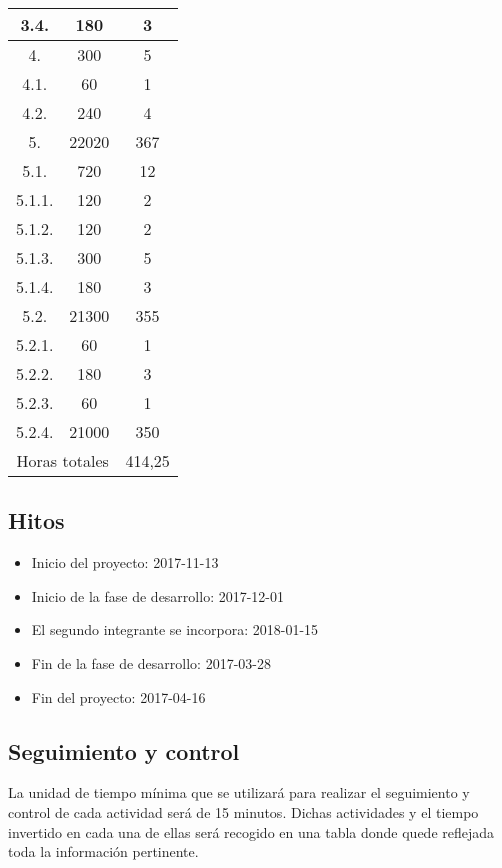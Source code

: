 \begin{longtable}{|c|c|c|}
3.4. & 180 & 3 \\ \hline
4. & 300 & 5 \\ \hline
4.1. & 60 & 1 \\ \hline
4.2. & 240 & 4 \\ \hline
5. & 22020 & 367 \\ \hline
5.1. & 720 & 12 \\ \hline
5.1.1. & 120 & 2 \\ \hline
5.1.2. & 120 & 2 \\ \hline
5.1.3. & 300 & 5 \\ \hline
5.1.4. & 180 & 3 \\ \hline
5.2. & 21300 & 355 \\ \hline
5.2.1. & 60 & 1 \\ \hline
5.2.2. & 180 & 3 \\ \hline
5.2.3. & 60 & 1 \\ \hline
5.2.4. & 21000 & 350 \\ \hline
\multicolumn{2}{|c|}{Horas totales} & 414,25 \\ \hline
\end{longtable}

\subsection{Hitos}
\begin{itemize}
  \item Inicio del proyecto: 2017-11-13
  \item Inicio de la fase de desarrollo: 2017-12-01
  \item El segundo integrante se incorpora: 2018-01-15
  \item Fin de la fase de desarrollo: 2017-03-28
  \item Fin del proyecto: 2017-04-16
\end{itemize}

\subsection{Seguimiento y control}
\label{subsec:syc:timeManagement}
La unidad de tiempo mínima que se utilizará para realizar el seguimiento y
control de cada actividad será de 15 minutos. Dichas actividades y el tiempo
invertido en cada una de ellas será recogido en una tabla donde quede reflejada
toda la información pertinente.
